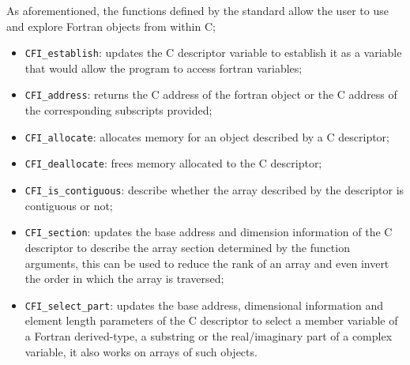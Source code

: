 As aforementioned, the functions defined by the standard \cite{fortran} allow the user to use and explore Fortran objects from within C;
\begin{itemize}
    \item \texttt{CFI\_establish}: updates the C descriptor variable to establish it as a variable that would allow the program to access fortran variables;
    \item \texttt{CFI\_address}: returns the C address of the fortran object or the C address of the corresponding subscripts provided;
    \item \texttt{CFI\_allocate}: allocates memory for an object described by a C descriptor;
    \item \texttt{CFI\_deallocate}: frees memory allocated to the C descriptor;
    \item \texttt{CFI\_is\_contiguous}: describe whether the array described by the descriptor is contiguous or not;
    \item \texttt{CFI\_section}: updates the base address and dimension information of the C descriptor to describe the array section determined by the function arguments, this can be used to reduce the rank of an array and even invert the order in which the array is traversed;
    \item \texttt{CFI\_select\_part}: updates the base address, dimensional information and element length parameters of the C descriptor to select a member variable of a Fortran derived-type, a substring or the real/imaginary part of a complex variable, it also works on arrays of such objects.
\end{itemize}

